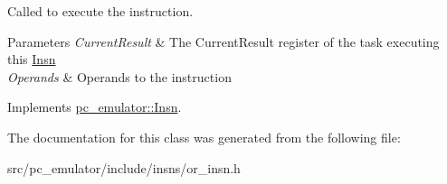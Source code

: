 Called to execute the instruction. 


\begin{DoxyParams}{Parameters}
{\em Current\+Result} & The Current\+Result register of the task executing this \hyperlink{classpc__emulator_1_1Insn}{Insn} \\
\hline
{\em Operands} & Operands to the instruction \\
\hline
\end{DoxyParams}


Implements \hyperlink{classpc__emulator_1_1Insn_a103d27030e872a799e313df16c1f3d66}{pc\+\_\+emulator\+::\+Insn}.



The documentation for this class was generated from the following file\+:\begin{DoxyCompactItemize}
\item 
src/pc\+\_\+emulator/include/insns/or\+\_\+insn.\+h\end{DoxyCompactItemize}
